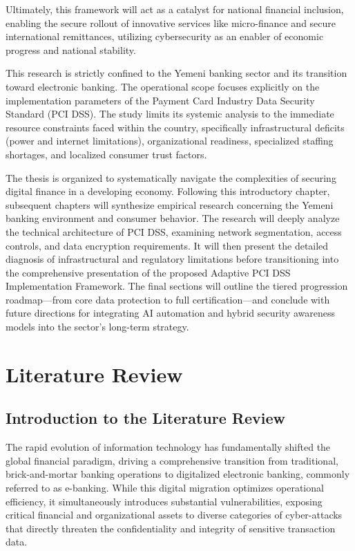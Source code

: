 \documentclass[12pt,a4paper,oneside]{report}
\begin{document}
	Ultimately, this framework will act as a catalyst for national financial inclusion, enabling the secure rollout of innovative services like micro-finance and secure international remittances, utilizing cybersecurity as an enabler of economic progress and national stability.
	
	This research is strictly confined to the Yemeni banking sector and its transition toward electronic banking. The operational scope focuses explicitly on the implementation parameters of the Payment Card Industry Data Security Standard (PCI DSS). The study limits its systemic analysis to the immediate resource constraints faced within the country, specifically infrastructural deficits (power and internet limitations), organizational readiness, specialized staffing shortages, and localized consumer trust factors.
	
	The thesis is organized to systematically navigate the complexities of securing digital finance in a developing economy. Following this introductory chapter, subsequent chapters will synthesize empirical research concerning the Yemeni banking environment and consumer behavior. The research will deeply analyze the technical architecture of PCI DSS, examining network segmentation, access controls, and data encryption requirements. It will then present the detailed diagnosis of infrastructural and regulatory limitations before transitioning into the comprehensive presentation of the proposed Adaptive PCI DSS Implementation Framework. The final sections will outline the tiered progression roadmap—from core data protection to full certification—and conclude with future directions for integrating AI automation and hybrid security awareness models into the sector's long-term strategy.
	
	\chapter{Literature Review}
	
	\section{Introduction to the Literature Review}
	The rapid evolution of information technology has fundamentally shifted the global financial paradigm, driving a comprehensive transition from traditional, brick-and-mortar banking operations to digitalized electronic banking, commonly referred to as e-banking. While this digital migration optimizes operational efficiency, it simultaneously introduces substantial vulnerabilities, exposing critical financial and organizational assets to diverse categories of cyber-attacks that directly threaten the confidentiality and integrity of sensitive transaction data. 
	
\end{document}
